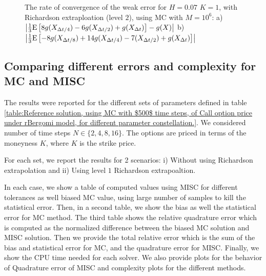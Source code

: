 \documentclass[11pt]{article}
\newcommand{\expt}[1]{\mathrm{E}\left[#1\right]}
\begin{document}
\begin{figure}[h!]
	\caption{The rate of convergence of the weak error for $H=0.07$ $K=1$, with Richardson extraploation (level $2$), using MC with $M=10^6$: a) $\abs{\frac{1}{3}\expt{8 g(X_{\Delta t/4}) -6g(X_{\Delta t/2}) +g(X_{\Delta t})}-g(X)}$  b) $\abs{\frac{1}{3}\expt{-8 g(X_{\Delta t/8}) +14g(X_{\Delta t/4})-7 (X_{\Delta t/2}) +g(X_{\Delta t})}}$} 
	\label{fig:Weak_rate_H_007_with_rich_level2}
\end{figure}



\FloatBarrier

\subsection{Comparing different  errors and complexity for MC and MISC}\label{sec:Comparing different  errors and complexity for MC and MISC}


The results were reported for the different sets of parameters defined in table \ref{table:Reference solution, using MC with $500$ time steps, of Call option price under rBergomi model, for different parameter constellation.}. We considered   number of time steps $N \in \{2,4,8,16\}$.  The options are priced in terms of the moneyness $K$, where $K$ is the strike price.   

 For each set,  we report the results for 2 scenarios: i) Without using Richardson extrapolation and  ii) Using level $1$ Richardson extrapoaltion.

In each case, we show a table of computed values using MISC for different tolerances as well biased MC value, using large number of samples to kill the statistical error. Then, in a second table,  we show the bias as well the statistical error for MC method. The third table shows the relative quadrature error which is computed as the normalized difference between the biased MC solution and MISC solution. Then we provide the total relative error which is the sum of the bias and statistical error for MC, and the quadrature error for MISC. Finally, we show the CPU time needed for each solver. We also provide plots for the behavior of Quadrature error of MISC and complexity plots for the different methods. 





\end{document}
